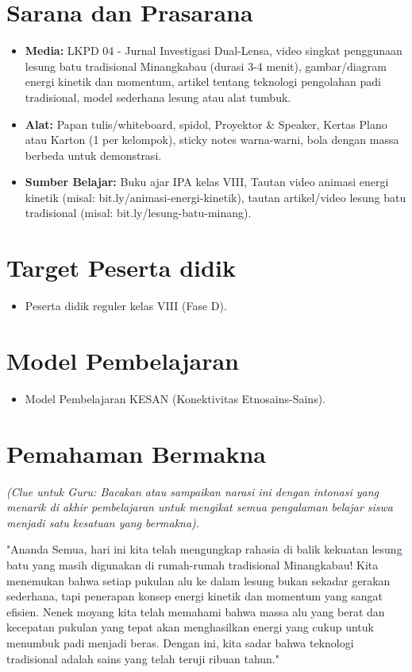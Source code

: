 \documentclass[a4paper,12pt]{article}
\begin{document}
\section{Sarana dan Prasarana}

\begin{itemize}
\item \textbf{Media:} LKPD 04 - Jurnal Investigasi Dual-Lensa, video singkat penggunaan lesung batu tradisional Minangkabau (durasi 3-4 menit), gambar/diagram energi kinetik dan momentum, artikel tentang teknologi pengolahan padi tradisional, model sederhana lesung atau alat tumbuk.
\item \textbf{Alat:} Papan tulis/whiteboard, spidol, Proyektor \& Speaker, Kertas Plano atau Karton (1 per kelompok), sticky notes warna-warni, bola dengan massa berbeda untuk demonstrasi.
\item \textbf{Sumber Belajar:} Buku ajar IPA kelas VIII, Tautan video animasi energi kinetik (misal: bit.ly/animasi-energi-kinetik), tautan artikel/video lesung batu tradisional (misal: bit.ly/lesung-batu-minang).
\end{itemize}

\section{Target Peserta didik}

\begin{itemize}
\item Peserta didik reguler kelas VIII (Fase D).
\end{itemize}

\section{Model Pembelajaran}

\begin{itemize}
\item Model Pembelajaran KESAN (Konektivitas Etnosains-Sains).
\end{itemize}

\section{Pemahaman Bermakna}
\textit{(Clue untuk Guru: Bacakan atau sampaikan narasi ini dengan intonasi yang menarik di akhir pembelajaran untuk mengikat semua pengalaman belajar siswa menjadi satu kesatuan yang bermakna).}

\begin{tcolorbox}[sectionbox]
"Ananda Semua, hari ini kita telah mengungkap rahasia di balik kekuatan lesung batu yang masih digunakan di rumah-rumah tradisional Minangkabau! Kita menemukan bahwa setiap pukulan alu ke dalam lesung bukan sekadar gerakan sederhana, tapi penerapan konsep energi kinetik dan momentum yang sangat efisien. Nenek moyang kita telah memahami bahwa massa alu yang berat dan kecepatan pukulan yang tepat akan menghasilkan energi yang cukup untuk menumbuk padi menjadi beras. Dengan ini, kita sadar bahwa teknologi tradisional adalah sains yang telah teruji ribuan tahun."
\end{tcolorbox}
\end{document}
